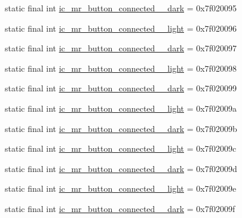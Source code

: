 \begin{CompactItemize}
\item 
static final int \hyperlink{classandroid_1_1support_1_1graphics_1_1drawable_1_1animated_1_1_r_1_1drawable_9b92efcb7dac36e130969fe91fdc3d5e}{ic\_\-mr\_\-button\_\-connected\_\_\-dark} = 0x7f020095
\item 
static final int \hyperlink{classandroid_1_1support_1_1graphics_1_1drawable_1_1animated_1_1_r_1_1drawable_08467ff208daf5d8ff7f8dca69afce76}{ic\_\-mr\_\-button\_\-connected\_\_\-light} = 0x7f020096
\item 
static final int \hyperlink{classandroid_1_1support_1_1graphics_1_1drawable_1_1animated_1_1_r_1_1drawable_df71f8618cbb7298aab9d38abe84b0f3}{ic\_\-mr\_\-button\_\-connected\_\_\-dark} = 0x7f020097
\item 
static final int \hyperlink{classandroid_1_1support_1_1graphics_1_1drawable_1_1animated_1_1_r_1_1drawable_78c7142e4e80696fbae805d45c693587}{ic\_\-mr\_\-button\_\-connected\_\_\-light} = 0x7f020098
\item 
static final int \hyperlink{classandroid_1_1support_1_1graphics_1_1drawable_1_1animated_1_1_r_1_1drawable_20dc2fd5d6627396f403b40b9e8c52fc}{ic\_\-mr\_\-button\_\-connected\_\_\-dark} = 0x7f020099
\item 
static final int \hyperlink{classandroid_1_1support_1_1graphics_1_1drawable_1_1animated_1_1_r_1_1drawable_4830cdcf6dec86510c77b7d40caf164e}{ic\_\-mr\_\-button\_\-connected\_\_\-light} = 0x7f02009a
\item 
static final int \hyperlink{classandroid_1_1support_1_1graphics_1_1drawable_1_1animated_1_1_r_1_1drawable_7386e01103014bba5728bd8480c64153}{ic\_\-mr\_\-button\_\-connected\_\_\-dark} = 0x7f02009b
\item 
static final int \hyperlink{classandroid_1_1support_1_1graphics_1_1drawable_1_1animated_1_1_r_1_1drawable_8910750990fb7d3ecae09537a4e616a3}{ic\_\-mr\_\-button\_\-connected\_\_\-light} = 0x7f02009c
\item 
static final int \hyperlink{classandroid_1_1support_1_1graphics_1_1drawable_1_1animated_1_1_r_1_1drawable_48a003207a568b2f9534438869a8b627}{ic\_\-mr\_\-button\_\-connected\_\_\-dark} = 0x7f02009d
\item 
static final int \hyperlink{classandroid_1_1support_1_1graphics_1_1drawable_1_1animated_1_1_r_1_1drawable_5a2072873db31d9874e8caf813948c34}{ic\_\-mr\_\-button\_\-connected\_\_\-light} = 0x7f02009e
\item 
static final int \hyperlink{classandroid_1_1support_1_1graphics_1_1drawable_1_1animated_1_1_r_1_1drawable_d2ac3c24a1916dddd7bd02556607a442}{ic\_\-mr\_\-button\_\-connected\_\_\-dark} = 0x7f02009f

\end{CompactItemize}

